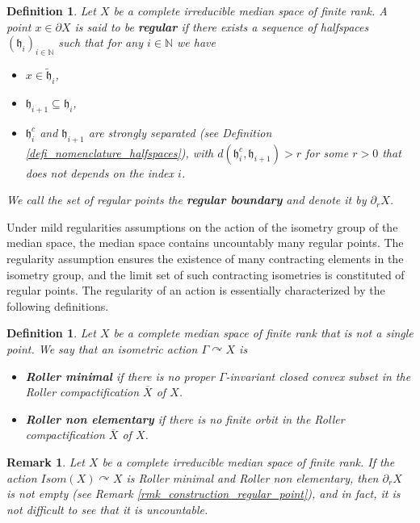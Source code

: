 \documentclass{amsart}
\numberwithin{equation}{section}
\newtheorem{defi}[thm]{Definition}
\newtheorem{rmk}[thm]{Remark}
\newcommand{\hh}{\mathfrak{h}}    %
\newcommand{\NN}{\mathbb{N}}      %
\theoremstyle{definition}
\def\bar{\overline}
\begin{document}
\begin{defi}
    Let $X$ be a complete irreducible median space of finite rank. A point $x\in \partial X$ is said to be \textbf{\textit{regular}} if there exists a sequence of halfspaces $(\hh_i)_{i\in\NN}$ such that for any $i\in\NN$ we have 
    \begin{itemize}
    \item $x\in \tilde{\hh}_i$,
    \item $\hh_{i+1}\subseteq \hh_i$,
    \item $\hh_i^c$ and $\hh_{i+1}$ are strongly separated (see Definition \ref{defi_nomenclature_halfspaces}), with $d(\hh_i^c,\hh_{i+1})>r$ for some $r>0$ that does not depends on the index $i$.
    \end{itemize}
    We call the set of regular points the \textbf{\textit{regular boundary}} and denote it by $\partial_r X$.
\end{defi}

Under mild regularities assumptions on the action of the isometry group of the median space, the median space contains uncountably many regular points. The regularity assumption ensures the existence of many contracting elements in the isometry group, and the limit set of such contracting isometries is constituted of regular points. The regularity of an action is essentially characterized by the following definitions.
\begin{defi}\label{def_Roller_minimal}
    Let $X$ be a complete median space of finite rank that is not a single point. We say that an isometric action $\Gamma\curvearrowright X$ is
    \begin{itemize}
        \item \textbf{\textit{Roller minimal}} if there is no proper $\Gamma$-invariant closed convex subset in the Roller compactification $\bar{X}$ of $X$.
        \item \textbf{\textit{Roller non elementary}} if there is no finite orbit in the Roller compactification $\bar{X}$ of $X$.
    \end{itemize}
\end{defi}

\begin{rmk}
Let $X$ be a complete irreducible median space of finite rank. If the action $Isom(X)\curvearrowright X$ is Roller minimal and Roller non elementary, then $\partial_r X$ is not empty (see Remark \ref{rmk_construction_regular_point}), and in fact, it is not difficult to see that it is uncountable.
\end{rmk}
\end{document}
